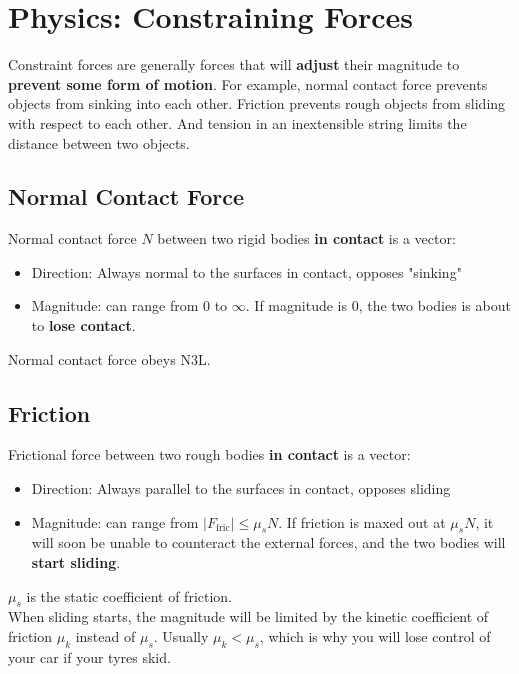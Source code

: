 \documentclass{article}
\begin{document}
\section{Physics: Constraining Forces}
\label{sec:fnt}
Constraint forces are generally forces that will \textbf{adjust} their magnitude to \textbf{prevent some form of motion}. For example, normal contact force prevents objects from sinking into each other. Friction prevents rough objects from sliding with respect to each other. And tension in an inextensible string limits the distance between two objects. 
\subsection{Normal Contact Force}
Normal contact force $N$ between two rigid bodies \textbf{in contact} is a vector:
\begin{itemize}
    \item Direction: Always normal to the surfaces in contact, opposes "sinking"
    \item Magnitude: can range from $0$ to $\infty$. If magnitude is $0$, the two bodies is about to \textbf{lose contact}.
\end{itemize}
Normal contact force obeys N3L.
\subsection{Friction}
Frictional force between two rough bodies \textbf{in contact} is a vector: 
\begin{itemize}
    \item Direction: Always parallel to the surfaces in contact, opposes sliding
    \item Magnitude: can range from $|F_{\text{fric}}| \leq \mu_s N$. If friction is maxed out at $\mu_s N$, it will soon be unable to counteract the external forces, and the two bodies will \textbf{start sliding}.
\end{itemize}
$\mu_s$ is the static coefficient of friction. \\[10pt]
When sliding starts, the magnitude will be limited by the kinetic coefficient of friction $\mu_k$ instead of $\mu_s$. Usually $\mu_k < \mu_s$, which is why you will lose control of your car if your tyres skid.
\end{document}
